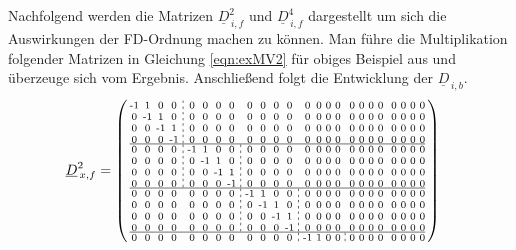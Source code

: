 \documentclass[pdftex,a4paper,parskip,listof=totoc,bibliography=totoc,onehalfspacing,12pt]{scrreprt}
\newcommand*\dashline{\hspace{-0.3em}\rotatebox[origin=c]{90}{\scalebox{-0.3}[1]{$-~~-$}}\hspace{-0.3em}}
\begin{document}
Nachfolgend werden die Matrizen $\underline{D}_{\,i,f}^2$ und $\underline{D}_{\,i,f}^4$ dargestellt um sich die Auswirkungen der FD-Ordnung machen zu können. Man führe die Multiplikation folgender Matrizen in Gleichung \ref{eqn:exMV2} für obiges Beispiel aus und überzeuge sich vom Ergebnis. Anschließend folgt die Entwicklung der $\underline{D}_{\,i,b}$.
\begin{align*}
	\underline{D}_{\,x,f}^2 &= \begin{psmallmatrix}
\text{-}1 & 1 & 0 & 0 &\dashline& 0 & 0 & 0 & 0 && 0 & 0 & 0 & 0 && 0 & 0 & 0 & 0 && 0 & 0 & 0 & 0 && 0 & 0 & 0 & 0 \\
0 & \text{-}1 & 1 & 0 &\dashline& 0 & 0 & 0 & 0 && 0 & 0 & 0 & 0 && 0 & 0 & 0 & 0 && 0 & 0 & 0 & 0 && 0 & 0 & 0 & 0 \\
0 & 0 & \text{-}1 & 1 &\dashline& 0 & 0 & 0 & 0 && 0 & 0 & 0 & 0 && 0 & 0 & 0 & 0 && 0 & 0 & 0 & 0 && 0 & 0 & 0 & 0 \\
0 & 0 & 0 & \text{-}1 &\dashline& 0 & 0 & 0 & 0 && 0 & 0 & 0 & 0 && 0 & 0 & 0 & 0 && 0 & 0 & 0 & 0 && 0 & 0 & 0 & 0 \\\hline
0 & 0 & 0 & 0 &\dashline& \text{-}1 & 1 & 0 & 0 &\dashline& 0 & 0 & 0 & 0 && 0 & 0 & 0 & 0 && 0 & 0 & 0 & 0 && 0 & 0 & 0 & 0 \\
0 & 0 & 0 & 0 &\dashline& 0 & \text{-}1 & 1 & 0 &\dashline& 0 & 0 & 0 & 0 && 0 & 0 & 0 & 0 && 0 & 0 & 0 & 0 && 0 & 0 & 0 & 0 \\
0 & 0 & 0 & 0 &\dashline& 0 & 0 & \text{-}1 & 1 &\dashline& 0 & 0 & 0 & 0 && 0 & 0 & 0 & 0 && 0 & 0 & 0 & 0 && 0 & 0 & 0 & 0 \\
0 & 0 & 0 & 0 &\dashline& 0 & 0 & 0 & \text{-}1 &\dashline& 0 & 0 & 0 & 0 && 0 & 0 & 0 & 0 && 0 & 0 & 0 & 0 && 0 & 0 & 0 & 0 \\\hline
0 & 0 & 0 & 0 && 0 & 0 & 0 & 0 &\dashline& \text{-}1 & 1 & 0 & 0 &\dashline& 0 & 0 & 0 & 0 && 0 & 0 & 0 & 0 && 0 & 0 & 0 & 0 \\
0 & 0 & 0 & 0 && 0 & 0 & 0 & 0 &\dashline& 0 & \text{-}1 & 1 & 0 &\dashline& 0 & 0 & 0 & 0 && 0 & 0 & 0 & 0 && 0 & 0 & 0 & 0 \\
0 & 0 & 0 & 0 && 0 & 0 & 0 & 0 &\dashline& 0 & 0 & \text{-}1 & 1 &\dashline& 0 & 0 & 0 & 0 && 0 & 0 & 0 & 0 && 0 & 0 & 0 & 0 \\
0 & 0 & 0 & 0 && 0 & 0 & 0 & 0 &\dashline& 0 & 0 & 0 & \text{-}1 &\dashline& 0 & 0 & 0 & 0 && 0 & 0 & 0 & 0 && 0 & 0 & 0 & 0 \\\hline
0 & 0 & 0 & 0 && 0 & 0 & 0 & 0 && 0 & 0 & 0 & 0 &\dashline& \text{-}1 & 1 & 0 & 0 &\dashline& 0 & 0 & 0 & 0 && 0 & 0 & 0 & 0 \\

\end{psmallmatrix}
\end{align*}
\end{document}
